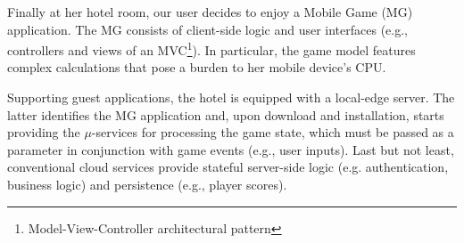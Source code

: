 

Finally at her hotel room, our user 
decides to enjoy a Mobile Game (MG) application. The MG consists of client-side logic and user interfaces (e.g., controllers and views of an MVC\footnote{Model-View-Controller architectural pattern}). In particular, the game model features complex calculations that pose a burden to her mobile device's CPU. 

Supporting guest applications, the hotel is equipped with a local-edge server. The latter identifies the MG application and, upon download and installation, starts providing the $\mu$-services for processing the game state, which must be passed as a parameter in conjunction with game events (e.g., user inputs). Last but not least, conventional cloud services provide stateful server-side logic (e.g. authentication, business logic) and persistence (e.g., player scores).  




